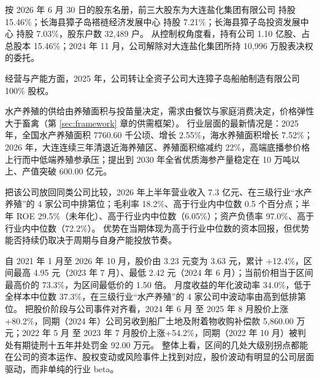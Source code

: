  按 2026 年 6 月 30 日的股东名册，前三大股东为大连盐化集团有限公司 持股 15.46\%；长海县獐子岛褡裢经济发展中心 持股 7.21\%；长海县獐子岛投资发展中心 持股 7.03\%，股东户数 32,489 户。 从控制权角度看，持有公司 1.10 亿股、占总股本 15.46\%；2024 年 11 月，公司解除对大连盐化集团所持 10,996 万股表决权的委托。

 经营与产能方面，2025 年，公司转让全资子公司大连獐子岛船舶制造有限公司 100\% 股权。

 水产养殖的供给由养殖面积与投苗量决定，需求由餐饮与家庭消费决定，价格弹性大于畜禽（第 \ref{sec:framework} 章的供需框架）。 行业层面的最新情况是：2025 年，全国水产养殖面积 7760.60 千公顷、增长 2.55\%，海水养殖面积增长 7.52\%；2026 年，大连连续三年清退近海养殖区、养殖面积缩减约 22\%，高端底播参价格上行而中低端养殖参承压；提出到 2030 年全省优质海参产量稳定在 10 万吨以上、产值突破 600.00 亿元。

 把该公司放回同类公司比较，2026 年上半年营业收入 7.3 亿元、在三级行业“水产养殖”的 4 家公司中排第位；毛利率 18.2\%、高于行业内中位数 0.5 个百分点；半年 ROE 29.5\%（未年化）、高于行业内中位数（6.05\%）；资产负债率 97.0\%、高于行业内中位数（72.2\%）。 优势在当期体现为高于行业中位数的资本回报，但优势能否持续仍取决于周期与自身产能投放节奏。

 自 2021 年 1 月至 2026 年 10 月，股价由 3.23 元变为 3.63 元，累计 +12.4\%，区间最高 4.95 元（2023 年 7 月）、最低 2.42 元（2024 年 6 月）；当前价相当于区间最高价的 73.3\%，为区间最低价的 1.50 倍。 月度收益的年化波动率 34.0\%，低于全样本中位数 37.3\%，在三级行业“水产养殖”的 4 家公司中波动率由高到低排第位。 把股价阶段与公司事件对齐看，2024 年 6 月 至 2025 年 8 月股价上涨+80.2\%，同期（2024 年）公司另收到船厂土地及附着物收购补偿款 5,860.00 万元；2022 年 5 月 至 2023 年 7 月股价上涨+54.2\%，同期（2022 年 10 月）被判处有期徒刑十五年并处罚金 92.00 万元。 整体上看，区间的几处大级别拐点都能在公司的资本运作、股权变动或风险事件上找到对应，股价波动有明显的公司层面驱动，而非单纯的行业 beta。


